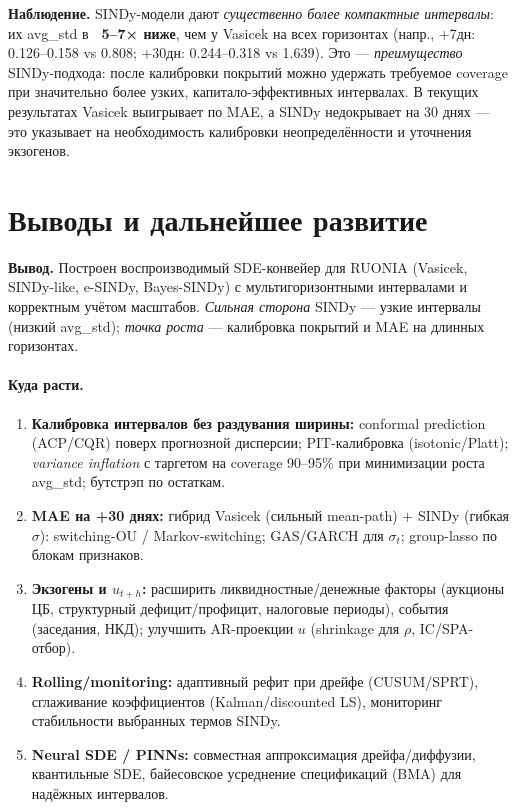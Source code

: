 \documentclass[14pt]{extarticle}
\begin{document}
\noindent\textbf{Наблюдение.} SINDy-модели дают \emph{существенно более компактные интервалы}: их avg\_std в \textbf{~5–7× ниже}, чем у Vasicek на всех горизонтах (напр., +7дн: 0.126–0.158 vs 0.808; +30дн: 0.244–0.318 vs 1.639). Это — \emph{преимущество} SINDy-подхода: после калибровки покрытий можно удержать требуемое coverage при значительно более узких, капитало-эффективных интервалах. В текущих результатах Vasicek выигрывает по MAE, а SINDy недокрывает на 30 днях — это указывает на необходимость калибровки неопределённости и уточнения экзогенов.

\section{Выводы и дальнейшее развитие}
\textbf{Вывод.} Построен воспроизводимый SDE-конвейер для RUONIA (Vasicek, SINDy-like, e-SINDy, Bayes-SINDy) с мультигоризонтными интервалами и корректным учётом масштабов. \emph{Сильная сторона} SINDy — узкие интервалы (низкий avg\_std); \emph{точка роста} — калибровка покрытий и MAE на длинных горизонтах.

\paragraph{Куда расти.}
\begin{enumerate}
  \item \textbf{Калибровка интервалов без раздувания ширины:} conformal prediction (ACP/CQR) поверх прогнозной дисперсии; PIT-калибровка (isotonic/Platt); \emph{variance inflation} с таргетом на coverage 90–95\% при минимизации роста avg\_std; бутстрэп по остаткам.
  \item \textbf{MAE на +30 днях:} гибрид Vasicek (сильный mean-path) + SINDy (гибкая $\sigma$): switching-OU / Markov-switching; GAS/GARCH для $\sigma_t$; group-lasso по блокам признаков.
  \item \textbf{Экзогены и $u_{t+h}$:} расширить ликвидностные/денежные факторы (аукционы ЦБ, структурный дефицит/профицит, налоговые периоды), события (заседания, НКД); улучшить AR-проекции $u$ (shrinkage для $\rho$, IC/SPA-отбор).
  \item \textbf{Rolling/monitoring:} адаптивный рефит при дрейфе (CUSUM/SPRT), сглаживание коэффициентов (Kalman/discounted LS), мониторинг стабильности выбранных термов SINDy.
  \item \textbf{Neural SDE / PINNs:} совместная аппроксимация дрейфа/диффузии, квантильные SDE, байесовское усреднение спецификаций (BMA) для надёжных интервалов.
\end{enumerate}
\end{document}
